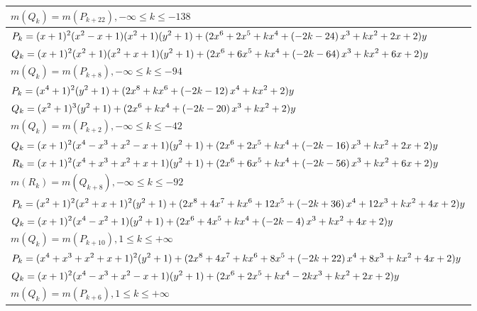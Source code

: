 \documentclass{amsart}
\begin{document}
\begin{longtable}{|l|}
 \(\displaystyle m(Q_k) = m(P_{k
 + 22}),-\infty \leqslant k \leqslant -138\)\\
 \hline
\(\displaystyle P_k=(x
 + 1)^{2}(x^2
 - x
 + 1)(x^2
 + 1)(y^2+1)+(2\*x^6
 + 2\*x^5
 + k\*x^4
 + \left(-2\*k
 - 24\right) \*x^3
 + k\*x^2
 + 2\*x
 + 2)y\)\\
\(\displaystyle Q_k=(x
 + 1)^{2}(x^2
 + 1)(x^2
 + x
 + 1)(y^2+1)+(2\*x^6
 + 6\*x^5
 + k\*x^4
 + \left(-2\*k
 - 64\right) \*x^3
 + k\*x^2
 + 6\*x
 + 2)y\)\\
\(\displaystyle m(Q_k) = m(P_{k
 + 8}),-\infty \leqslant k \leqslant -94\)\\
\hline
\(\displaystyle P_k=(x^4
 + 1)^{2}(y^2+1)+(2\*x^8
 + k\*x^6
 + \left(-2\*k
 - 12\right) \*x^4
 + k\*x^2
 + 2)y\)\\
\(\displaystyle Q_k=(x^2
 + 1)^{3}(y^2+1)+(2\*x^6
 + k\*x^4
 + \left(-2\*k
 - 20\right) \*x^3
 + k\*x^2
 + 2)y\)\\
\(\displaystyle m(Q_k) = m(P_{k
 + 2}),-\infty \leqslant k \leqslant -42\)\\
\hline
\(\displaystyle Q_k=(x
 + 1)^{2}(x^4
 - x^3
 + x^2
 - x
 + 1)(y^2+1)+(2\*x^6
 + 2\*x^5
 + k\*x^4
 + \left(-2\*k
 - 16\right) \*x^3
 + k\*x^2
 + 2\*x
 + 2)y\)\\
\(\displaystyle R_k=(x
 + 1)^{2}(x^4
 + x^3
 + x^2
 + x
 + 1)(y^2+1)+(2\*x^6
 + 6\*x^5
 + k\*x^4
 + \left(-2\*k
 - 56\right) \*x^3
 + k\*x^2
 + 6\*x
 + 2)y\)\\
\(\displaystyle m(R_k) = m(Q_{k
 + 8}),-\infty \leqslant k \leqslant -92\)\\
\hline 
\(\displaystyle P_k=(x^2
 + 1)^{2}(x^2
 + x
 + 1)^{2}(y^2+1)+(2\*x^8
 + 4\*x^7
 + k\*x^6
 + 12\*x^5
 + \left(-2\*k
 + 36\right) \*x^4
 + 12\*x^3
 + k\*x^2
 + 4\*x
 + 2)y\)\\
\(\displaystyle Q_k=(x
 + 1)^{2}(x^4
 - x^2
 + 1)(y^2+1)+(2\*x^6
 + 4\*x^5
 + k\*x^4
 + \left(-2\*k
 - 4\right) \*x^3
 + k\*x^2
 + 4\*x
 + 2)y\)\\
\(\displaystyle m(Q_k) = m(P_{k
 + 10}),1 \leqslant k \leqslant +\infty\)\\
\hline
\(\displaystyle P_k=(x^4
 + x^3
 + x^2
 + x
 + 1)^{2}(y^2+1)+(2\*x^8
 + 4\*x^7
 + k\*x^6
 + 8\*x^5
 + \left(-2\*k
 + 22\right) \*x^4
 + 8\*x^3
 + k\*x^2
 + 4\*x
 + 2)y\)\\
\(\displaystyle Q_k=(x
 + 1)^{2}(x^4
 - x^3
 + x^2
 - x
 + 1)(y^2+1)+(2\*x^6
 + 2\*x^5
 + k\*x^4
 - 2\*k\*x^3
 + k\*x^2
 + 2\*x
 + 2)y\)\\
\(\displaystyle m(Q_k) = m(P_{k
 + 6}),1 \leqslant k \leqslant +\infty\)\\

\end{longtable}
\end{document}
